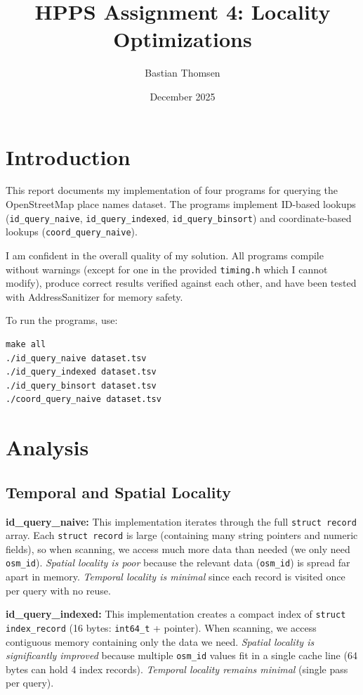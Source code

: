 \documentclass[a4paper,11pt]{article}
\title{HPPS Assignment 4: Locality Optimizations}
\author{Bastian Thomsen}
\date{December 2025}
\begin{document}
\maketitle

\section{Introduction}

This report documents my implementation of four programs for querying the OpenStreetMap place names dataset. The programs implement ID-based lookups (\texttt{id\_query\_naive}, \texttt{id\_query\_indexed}, \texttt{id\_query\_binsort}) and coordinate-based lookups (\texttt{coord\_query\_naive}).

I am confident in the overall quality of my solution. All programs compile without warnings (except for one in the provided \texttt{timing.h} which I cannot modify), produce correct results verified against each other, and have been tested with AddressSanitizer for memory safety.

To run the programs, use:
\begin{verbatim}
make all
./id_query_naive dataset.tsv
./id_query_indexed dataset.tsv
./id_query_binsort dataset.tsv
./coord_query_naive dataset.tsv
\end{verbatim}

\section{Analysis}

\subsection{Temporal and Spatial Locality}

\textbf{id\_query\_naive:} This implementation iterates through the full \texttt{struct record} array. Each \texttt{struct record} is large (containing many string pointers and numeric fields), so when scanning, we access much more data than needed (we only need \texttt{osm\_id}). \emph{Spatial locality is poor} because the relevant data (\texttt{osm\_id}) is spread far apart in memory. \emph{Temporal locality is minimal} since each record is visited once per query with no reuse.

\textbf{id\_query\_indexed:} This implementation creates a compact index of \texttt{struct index\_record} (16 bytes: \texttt{int64\_t} + pointer). When scanning, we access contiguous memory containing only the data we need. \emph{Spatial locality is significantly improved} because multiple \texttt{osm\_id} values fit in a single cache line (64 bytes can hold 4 index records). \emph{Temporal locality remains minimal} (single pass per query).
\end{document}
